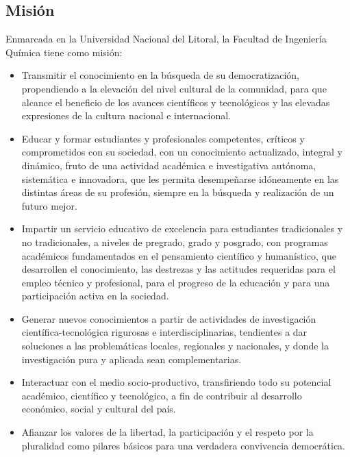 \documentclass[10pt,a4paper,final]{article}
\begin{document}
\subsection{Misión}
Enmarcada en la Universidad Nacional del Litoral, la Facultad de Ingeniería Química tiene como misión:
\begin{itemize}
\item Transmitir el conocimiento en la búsqueda de su democratización, propendiendo a la elevación del nivel cultural de la comunidad, para que alcance el beneficio de los avances científicos y tecnológicos y las elevadas expresiones de la cultura nacional e internacional.
\item Educar y formar estudiantes y profesionales competentes, críticos y comprometidos con su sociedad, con un conocimiento actualizado, integral y dinámico, fruto de una actividad académica e investigativa autónoma, sistemática e innovadora, que les permita desempeñarse idóneamente en las distintas áreas de su profesión, siempre en la búsqueda y realización de un futuro mejor.
\item Impartir un servicio educativo de excelencia para estudiantes tradicionales y no tradicionales, a niveles de pregrado, grado y posgrado, con programas académicos fundamentados en el pensamiento científico y humanístico, que desarrollen el conocimiento, las destrezas y las actitudes requeridas para el empleo técnico y profesional, para el progreso de la educación y para una participación activa en la sociedad.
\item Generar nuevos conocimientos a partir de actividades de investigación científica-tecnológica rigurosas e interdisciplinarias, tendientes a dar soluciones a las problemáticas locales, regionales y nacionales, y donde la investigación pura y aplicada sean complementarias.
\item Interactuar con el medio socio-productivo, transfiriendo todo su potencial académico, científico y tecnológico, a fin de contribuir al desarrollo económico, social y cultural del país.
\item Afianzar los valores de la libertad, la participación y el respeto por la pluralidad como pilares básicos para una verdadera convivencia democrática.
\end{itemize}
\end{document}
